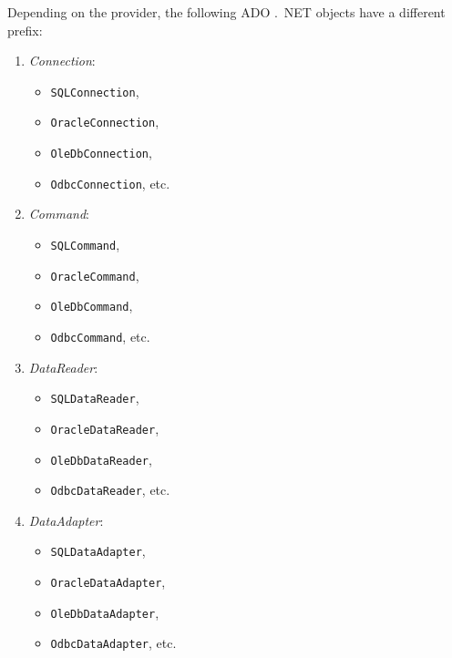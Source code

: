 Depending on the provider, the following ADO .\ NET objects have a different prefix:
\begin{multicols}{2}
		\begin{enumerate}
		\item \textit{Connection}: 
		\begin{itemize}
			\item \texttt{SQLConnection}, 
			\item \texttt{OracleConnection}, 
			\item \texttt{OleDbConnection}, 
			\item \texttt{OdbcConnection}, etc.
		\end{itemize}
	
		\item \textit{Command}: 
		\begin{itemize}
			\item \texttt{SQLCommand}, 
			\item \texttt{OracleCommand}, 
			\item \texttt{OleDbCommand}, 
			\item \texttt{OdbcCommand}, etc.
		\end{itemize}
	\item \textit{DataReader}: 
		\begin{itemize}
			\item \texttt{SQLDataReader}, 
			\item \texttt{OracleDataReader}, 
			\item \texttt{OleDbDataReader}, 
			\item \texttt{OdbcDataReader}, etc.
		\end{itemize}

		\item \textit{DataAdapter}: 
		\begin{itemize}
			\item \texttt{SQLDataAdapter}, 
			\item \texttt{OracleDataAdapter}, 
			\item \texttt{OleDbDataAdapter}, 
			\item \texttt{OdbcDataAdapter}, etc.
		\end{itemize}
	\end{enumerate}
\end{multicols}


